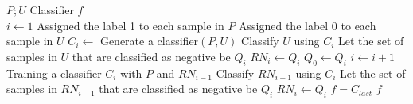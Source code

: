 \documentclass{article}
\begin{document}
\begin{algorithm}[!h]
\renewcommand{\algorithmicrequire}{\textbf{Input:}} %
\renewcommand{\algorithmicensure}{\textbf{Output:}} %
	\caption{Modified PU-learning} %
	\begin{algorithmic}[1] %
	    \REQUIRE
	    $P;U$
	    \ENSURE
	    Classifier $f$ \\
	    \STATE $i\leftarrow 1$
		\STATE Assigned the label 1 to each sample in $P$
		\STATE Assigned the label 0 to each sample in $U$
		\STATE $C_i\leftarrow$ Generate a classifier$(P,U)$
		\STATE Classify $U$ using $C_i$
		\STATE Let the set of samples in $U$ that are classified as negative be $Q_i$
		\STATE $RN_i\leftarrow Q_i$
		\STATE $Q_0\leftarrow Q_i$
        \STATE $i\leftarrow i+1$
        \STATE Training a classifier $C_i$ with $P$ and $RN_{i-1}$
        \STATE Classify $RN_{i-1}$ using $C_i$
        \STATE Let the set of samples in $RN_{i-1}$ that are classified as negative be $Q_i$
        \STATE $RN_i\leftarrow Q_i$
		\ENDWHILE
		\STATE $f=C_{last}$
		\RETURN $f$
	\end{algorithmic}
\end{algorithm}
\end{document}
